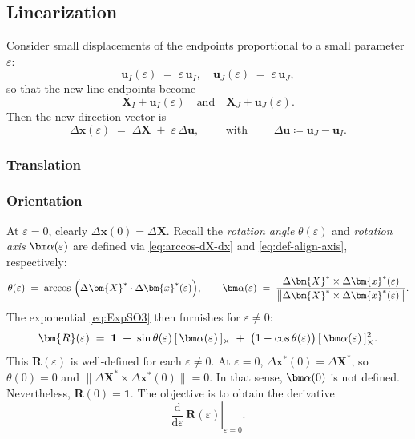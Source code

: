 \subsection{Linearization}

Consider small displacements of the endpoints proportional to a small parameter \(\varepsilon\):
\[
\bm{u}_I(\varepsilon) \;=\; \varepsilon\,\bm{u}_I, 
\quad
\bm{u}_J(\varepsilon) \;=\; \varepsilon\,\bm{u}_J,
\]
so that the new line endpoints become 
\[
\bm{X}_I + \bm{u}_I(\varepsilon)
\quad\text{and}\quad
\bm{X}_J + \bm{u}_J(\varepsilon).
\] 
Then the new direction vector is 
\begin{equation}
    \Delta \bm{x}(\varepsilon)
    \;=\;
    \Delta \bm{X} \;+\; \varepsilon\,\Delta \bm{u},
    \qquad\text{ with }\qquad
    \Delta \bm{u} \coloneq \bm{u}_J - \bm{u}_I.
\label{eq:order-Dx}
\end{equation} 

\subsubsection{Translation}

\subsubsection{Orientation}
At \(\varepsilon=0\), clearly \(\Delta \bm{x}(0) = \Delta \bm{X}\). 
Recall the \emph{rotation angle} \(\theta(\varepsilon)\) and \emph{rotation axis} \(\AlignAxis(\varepsilon)\) are defined via \eqref{eq:arccos-dX-dx} and \eqref{eq:def-align-axis}, respectively:
  \[
    \theta(\varepsilon)
    \;=\;
    \arccos~\Bigl(
      \Delta \bm{X}^*\cdot \Delta \bm{x}^*(\varepsilon)
    \Bigr),
    \qquad
    \AlignAxis(\varepsilon)
    \;=\;
    \frac{
      \Delta \bm{X}^*\times \Delta \bm{x}^*(\varepsilon)
    }{
      \bigl\|\Delta \bm{X}^*\times \Delta \bm{x}^*(\varepsilon)\bigr\|
    }.
\] 
The exponential \eqref{eq:ExpSO3} then furnishes for \(\varepsilon\neq 0\): 
\[
\bm{R}(\varepsilon)
\;=\;
\mathbf{1}
\;+\;
\sin \theta(\varepsilon) \,
[\,\AlignAxis(\varepsilon)\,]_{\times}
\;+\;
\bigl(1-\cos\theta(\varepsilon)\bigr)\,
[\,\AlignAxis(\varepsilon)\,]_{\times}^2.
\] 
This \(\bm{R}(\varepsilon)\) is well‐defined for each
\(\varepsilon\neq 0\). 
At \(\varepsilon=0\), \(\Delta \bm{x}^*(0)=\Delta \bm{X}^*\),
so \(\theta(0) = 0\) and
\(\|\Delta \bm{X}^*\times \Delta \bm{x}^*(0)\|=0\). 
In that sense, \(\AlignAxis(0)\) is not defined. Nevertheless, \(\bm{R}(0)=\mathbf{1}\).
%
The objective is to obtain the derivative 
\[
\left.\frac{\mathrm{d}}{\mathrm{d}\varepsilon}\,\bm{R}(\varepsilon)\right|_{\varepsilon=0}.
\]
%

